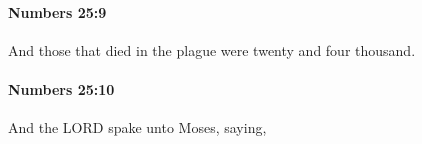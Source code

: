 		\paragraph{Numbers 25:9} %
			\label{NUMBERS-25-9}

			And those that died in the plague were twenty and four thousand.


		\paragraph{Numbers 25:10} %
			\label{NUMBERS-25-10}

			And the LORD spake unto Moses, saying,


